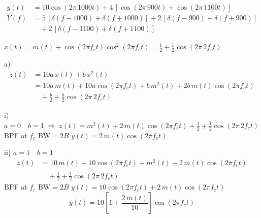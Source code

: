 \documentclass[11pt,a4paper]{article}
\begin{document}
\begin{align*}
y(t) &= 10\cos(2\pi\,1000t)+4\,[\cos(2\pi\,900t)+\cos(2\pi\,1100t)]\\
Y(f) &= 5\,[\delta(f-1000)+\delta(f+1000)]+2\,[\delta(f-900)+\delta(f+900)]\\
 &\quad +2\,[\delta(f-1100)+\delta(f+1100)]
\end{align*}

\begin{center}
\end{center}


\noindent $x(t)=m(t)+\cos(2\pi f_c t)$\qquad $\cos^2(2\pi f_c t)=\tfrac12+\tfrac12\cos(2\pi\,2f_c t)$\qquad {}

\noindent a)
\begin{align*}
z(t) &= 10a\,x(t)+b\,x^2(t)\\
 &= 10a\,m(t)+10a\cos(2\pi f_c t)+b\,m^2(t)+2b\,m(t)\cos(2\pi f_c t)\\
 &\quad +\tfrac{b}{2}+\tfrac{b}{2}\cos(2\pi\,2f_c t)
\end{align*}

\noindent i) $a=0\quad b=1 \;\Rightarrow\; z(t)=m^2(t)+2\,m(t)\cos(2\pi f_c t)+\tfrac12+\tfrac12\cos(2\pi\,2f_c t)$\\
\hspace*{2em}BPF at $f_c$ \qquad BW$=2B$ \qquad $y(t)=2\,m(t)\cos(2\pi f_c t)$

\noindent ii) $a=1\quad b=1$
\begin{align*}
z(t)&=10\,m(t)+\underline{10\cos(2\pi f_c t)}+m^2(t)+\underline{2\,m(t)\cos(2\pi f_c t)}\\
&\quad+\tfrac12+\tfrac12\cos(2\pi\,2f_c t)
\end{align*}
BPF at $f_c$ \qquad BW$=2B$ \qquad $y(t)=10\cos(2\pi f_c t)+2\,m(t)\cos(2\pi f_c t)$
\[
y(t)=10\left[1+\frac{2\,m(t)}{10}\right]\cos(2\pi f_c t)
\]
\end{document}
